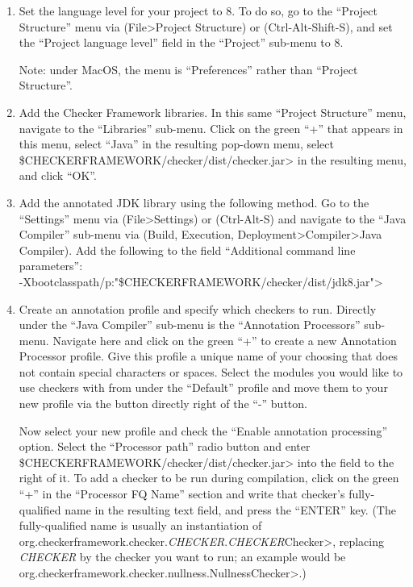 \begin{enumerate}

\item
  Set the language level for your project to 8.  To do so, go to the
  ``Project Structure'' menu via (File>Project Structure) or
  (Ctrl-Alt-Shift-S), and set the ``Project language level'' field in the
  ``Project'' sub-menu to 8.

  Note: under MacOS, the menu is ``Preferences'' rather than ``Project Structure''.

\item
  Add the Checker Framework libraries.  In this same ``Project Structure''
  menu, navigate to the ``Libraries'' sub-menu.  Click on the green ``+'' that
  appears in this menu, select ``Java'' in the resulting pop-down menu,
  select \<\$CHECKERFRAMEWORK/checker/dist/checker.jar> in the resulting menu,
  and click ``OK''.

\item
  Add the annotated JDK library using the following method.
  Go to the ``Settings'' menu via (File>Settings) or (Ctrl-Alt-S) and
  navigate to the ``Java Compiler'' sub-menu via (Build, Execution,
  Deployment>Compiler>Java Compiler).  Add the following to the field
  ``Additional command line parameters'': \\
  \<-Xbootclasspath/p:"\$CHECKERFRAMEWORK/checker/dist/jdk8.jar">

\item
  Create an annotation profile and specify which checkers to run.
  Directly under the ``Java Compiler'' sub-menu is the ``Annotation
  Processors'' sub-menu. Navigate here and click on the green ``+'' to create
  a new Annotation Processor profile.  Give this profile a unique name of your
  choosing that does not contain special characters or spaces.
  Select the modules you would like to
  use checkers with from under the ``Default'' profile and move them to your
  new profile via the button directly right of the ``-'' button.

  Now select your new profile and check the ``Enable annotation processing''
  option. Select the ``Processor path'' radio button and enter
  \<\$CHECKERFRAMEWORK/checker/dist/checker.jar> into the field to the right
  of it. To add a checker to be run during compilation, click on the green
  ``+'' in the ``Processor FQ Name'' section and write that checker's
  fully-qualified name in
  the resulting text field, and press the ``ENTER'' key.
  (The fully-qualified name is usually an instantiation of
  \<org.checkerframework.checker.\emph{CHECKER}.\emph{CHECKER}Checker>,
  replacing \emph{CHECKER} by the checker you
  want to run; an example would be
  \<org.checkerframework.checker.nullness.NullnessChecker>.)

\end{enumerate}

